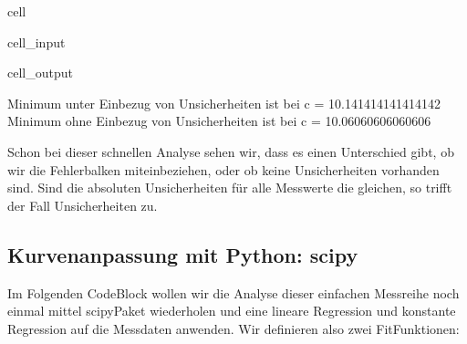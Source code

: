 \documentclass[letterpaper,10pt,english]{jupyterBook}
\begin{document}
\begin{sphinxuseclass}{cell}
\begin{sphinxVerbatimInput}
\begin{sphinxuseclass}{cell_input}
\end{sphinxuseclass}\end{sphinxVerbatimInput}
\begin{sphinxVerbatimOutput}

\begin{sphinxuseclass}{cell_output}
\begin{sphinxVerbatim}[commandchars=\\\{\}]
Minimum unter Einbezug von Unsicherheiten ist bei c = 10.141414141414142
Minimum ohne  Einbezug von Unsicherheiten ist bei c = 10.06060606060606
\end{sphinxVerbatim}

\noindent{}

\end{sphinxuseclass}\end{sphinxVerbatimOutput}

\end{sphinxuseclass}
\sphinxAtStartPar
Schon bei dieser schnellen Analyse sehen wir, dass es einen Unterschied gibt, ob wir die Fehlerbalken miteinbeziehen, oder ob keine Unsicherheiten vorhanden sind. Sind die absoluten Unsicherheiten für alle Messwerte die gleichen, so trifft der Fall  Unsicherheiten zu.


\subsection{Kurvenanpassung mit Python: scipy }
\label{\detokenize{content/T_FitmitFehlerbalken:kurvenanpassung-mit-python-scipy-a-id-subsec-scipy-bsp2-a}}
\sphinxAtStartPar
Im Folgenden Code\sphinxhyphen{}Block wollen wir die Analyse dieser einfachen Messreihe noch einmal mittel scipy\sphinxhyphen{}Paket wiederholen und eine lineare Regression und konstante Regression auf die Messdaten anwenden. Wir definieren also zwei Fit\sphinxhyphen{}Funktionen:
\end{document}
